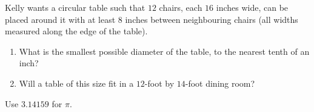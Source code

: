 Kelly wants a circular table such that $12$ chairs, each $16$ inches wide, can be placed around it with at least $8$ inches between neighbouring chairs (all widths measured along the edge of the table).
\begin{enumerate}
\item[(a)] What is the smallest possible diameter of the table, to the nearest tenth of an inch?
\item[(b)] Will a table of this size fit in a $12$-foot by $14$-foot dining room?
\end{enumerate}
Use $3.14159$ for $\pi$.
